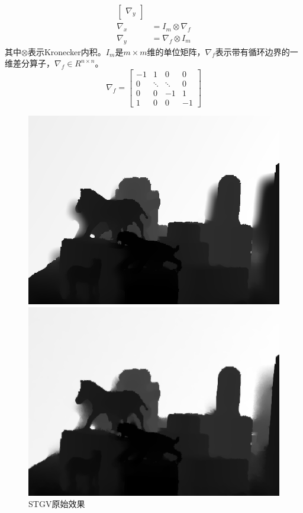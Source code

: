 \documentclass[UTF8]{ctexart}
\begin{document}
\begin{sloppypar}
\begin{equation}
\begin{aligned}
\begin{bmatrix}
                     \nabla_y
        \end{bmatrix}\\
            \nabla_x &= I_m \otimes \nabla_f\\
            \nabla_y &= \nabla_f \otimes I_m
        \end{aligned}
    \end{equation}
    其中$\otimes$表示Kronecker内积。$I_m$是$m\times m$维的单位矩阵，$\nabla_f$表示带有循环边界的一维差分算子，$\nabla_f\in R^{n\times n}$。
    \begin{equation}
        \nabla_f=\begin{bmatrix}
                     -1 &1      &0      &0\\
                     0  &\ddots &\ddots &0\\
                     0  &0      &-1     &1\\
                     1  &0      &0      &-1
        \end{bmatrix}
    \end{equation}
    \begin{figure}[htbp]
        \begin{minipage}[t]{0.5\linewidth}
            \centering
            \includegraphics[width=0.9\linewidth]{figure/stgvl2_54740iter_4562s}
            \caption{\small STGV原始效果}
            \label{fig:stgv_54740}
        \end{minipage}
        \begin{minipage}[t]{0.5\linewidth}
            \centering
            \includegraphics[width=0.8\linewidth]{figure/stgvColorF_54740iter_4562s}

\end{minipage}
\end{figure}
\end{sloppypar}
\end{document}
